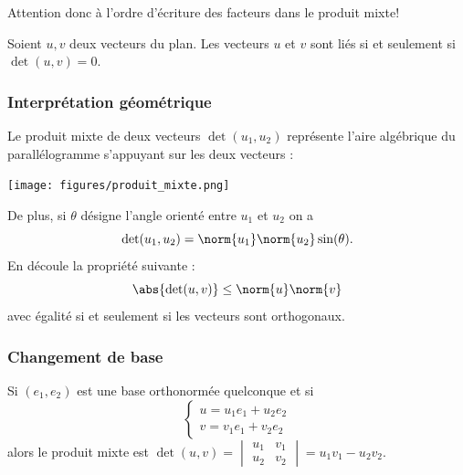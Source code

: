 \begin{remark}
	Attention donc à l'ordre d'écriture des facteurs dans le produit mixte!
\end{remark}

\begin{proposition}
	Soient $u,v$ deux vecteurs du plan. Les vecteurs $u$ et $v$ sont liés si et seulement si $\det(u,v) =0$.
\end{proposition}


\subsubsection{Interprétation  géométrique}

Le produit mixte de deux vecteurs $\det(u_1,u_2)$ représente l'aire algébrique du parallélogramme s'appuyant sur les deux vecteurs :
\begin{center}
	\texttt{[image: figures/produit\_mixte.png]}
\end{center}




De plus, si $\theta$ désigne l'angle orienté entre $u_1$ et $u_2$ on a 
\[
	\det(u_1,u_2) = \norm{u_1} \norm{u_2} \sin(\theta).
\]
En découle la propriété suivante :
\[
	\abs{\det(u,v)}\leq \norm{u} \norm{v}
\]
avec égalité si et seulement si les vecteurs sont orthogonaux.

\subsubsection{Changement de base}

\begin{proposition}
Si $(e_1,e_2)$ est une base orthonormée quelconque et si 
\[
	\begin{cases}
		u = u_1 e_1 + u_2 e_2 \\
		v = v_1 e_1 + v_2 e_2 
	\end{cases}
\]
alors le produit mixte est $\det(u,v) =\begin{vmatrix}
			u_1 & v_1 \\
			u_2 & v_2
		\end{vmatrix}  = u_1 v_1 - u_2v_2$.
\end{proposition}

